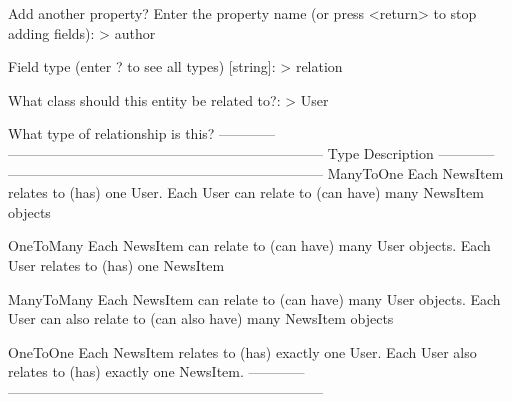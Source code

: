 \documentclass[a4paperpaper,openright]{book}
\newenvironment{Shaded}{}{}
\newcommand{\BuiltInTok}[1]{#1}
\newcommand{\ExtensionTok}[1]{#1}
\newcommand{\NormalTok}[1]{#1}
\newcommand{\OperatorTok}[1]{\textcolor[rgb]{0.40,0.40,0.40}{#1}}
\begin{document}
\begin{Shaded}
\begin{Highlighting}[]
     \ExtensionTok{Add}\NormalTok{ another property? Enter the property name (or press }\OperatorTok{<}\NormalTok{return}\OperatorTok{>}\NormalTok{ to stop adding fields)}\BuiltInTok{:}
     \OperatorTok{>} \ExtensionTok{author}
    
     \ExtensionTok{Field}\NormalTok{ type (enter ? to see all types) [}\ExtensionTok{string}\NormalTok{]:}
     \OperatorTok{>} \ExtensionTok{relation}
    
     \ExtensionTok{What}\NormalTok{ class should this entity be related to?:}
     \OperatorTok{>} \ExtensionTok{User}
    
    \ExtensionTok{What}\NormalTok{ type of relationship is this?}
     \ExtensionTok{------------}\NormalTok{ -------------------------------------------------------------------- }
      \ExtensionTok{Type}\NormalTok{         Description                                                         }
     \ExtensionTok{------------}\NormalTok{ -------------------------------------------------------------------- }
      \ExtensionTok{ManyToOne}\NormalTok{    Each NewsItem relates to (has) }\ExtensionTok{one}\NormalTok{ User.                            }
                   \ExtensionTok{Each}\NormalTok{ User can relate to (can have) }\ExtensionTok{many}\NormalTok{ NewsItem objects            }
                                                                                       
      \ExtensionTok{OneToMany}\NormalTok{    Each NewsItem can relate to (can have) }\ExtensionTok{many}\NormalTok{ User objects.           }
                   \ExtensionTok{Each}\NormalTok{ User relates to (has) }\ExtensionTok{one}\NormalTok{ NewsItem                             }
                                                                                       
      \ExtensionTok{ManyToMany}\NormalTok{   Each NewsItem can relate to (can have) }\ExtensionTok{many}\NormalTok{ User objects.           }
                   \ExtensionTok{Each}\NormalTok{ User can also relate to (can also have) }\ExtensionTok{many}\NormalTok{ NewsItem objects  }
                                                                                       
      \ExtensionTok{OneToOne}\NormalTok{     Each NewsItem relates to (has) }\ExtensionTok{exactly}\NormalTok{ one User.                    }
                   \ExtensionTok{Each}\NormalTok{ User also relates to (has) }\ExtensionTok{exactly}\NormalTok{ one NewsItem.               }
     \ExtensionTok{------------}\NormalTok{ -------------------------------------------------------------------- }
    

\end{Highlighting}
\end{Shaded}
\end{document}
